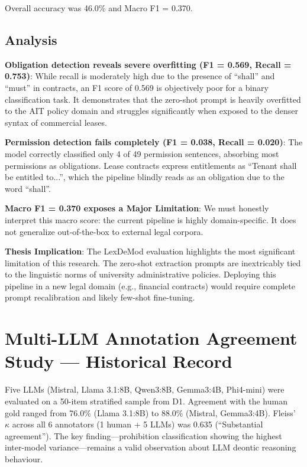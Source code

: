 Overall accuracy was 46.0\% and Macro F1 = 0.370.

\subsection{Analysis}

\textbf{Obligation detection reveals severe overfitting (F1 = 0.569, Recall = 0.753)}: While recall is moderately high due to the presence of ``shall'' and ``must'' in contracts, an F1 score of 0.569 is objectively poor for a binary classification task. It demonstrates that the zero-shot prompt is heavily overfitted to the AIT policy domain and struggles significantly when exposed to the denser syntax of commercial leases.

\textbf{Permission detection fails completely (F1 = 0.038, Recall = 0.020)}: The model correctly classified only 4 of 49 permission sentences, absorbing most permissions as obligations. Lease contracts express entitlements as ``Tenant shall be entitled to...'', which the pipeline blindly reads as an obligation due to the word ``shall''. 

\textbf{Macro F1 = 0.370 exposes a Major Limitation}: We must honestly interpret this macro score: the current pipeline is highly domain-specific. It does not generalize out-of-the-box to external legal corpora. 

\textbf{Thesis Implication}: The LexDeMod evaluation highlights the most significant limitation of this research. The zero-shot extraction prompts are inextricably tied to the linguistic norms of university administrative policies. Deploying this pipeline in a new legal domain (e.g., financial contracts) would require complete prompt recalibration and likely few-shot fine-tuning.

\section{Multi-LLM Annotation Agreement Study --- Historical Record}
\label{sec:multi-llm-agreement}

Five LLMs (Mistral, Llama 3.1:8B, Qwen3:8B, Gemma3:4B, Phi4-mini) were evaluated on a 50-item stratified sample from D1. Agreement with the human gold ranged from 76.0\% (Llama 3.1:8B) to 88.0\% (Mistral, Gemma3:4B). Fleiss' $\kappa$ across all 6 annotators (1 human + 5 LLMs) was 0.635 (``Substantial agreement''). The key finding---prohibition classification showing the highest inter-model variance---remains a valid observation about LLM deontic reasoning behaviour.

